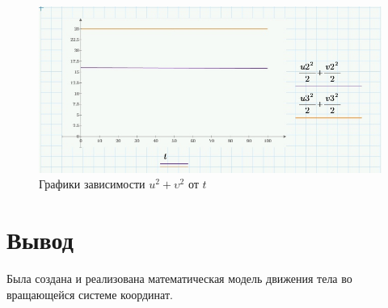 \documentclass[a4paper, 14pt]{extarticle}
\begin{document}
		\begin{figure}[H]
			\centering
			\includegraphics[width = \linewidth]{3.jpg}
			\caption{Графики зависимости $u^2+\upsilon^2$ от $t$}
		\end{figure}
		
	\section{Вывод}
		Была создана и реализована математическая модель движения тела во вращающейся системе координат.
		
\end{document}
